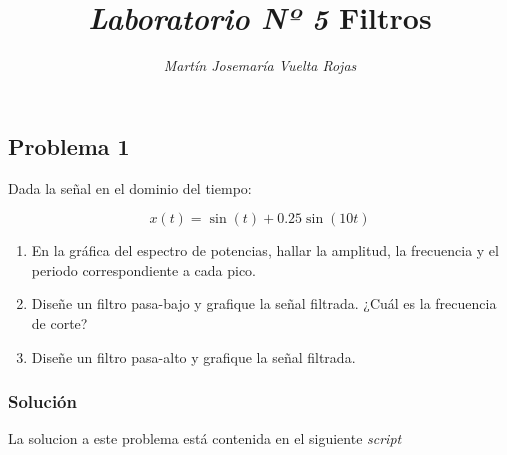 \documentclass[a4paper,12pt,final]{article}
\begin{document}
  \title{\textit{\Large Laboratorio Nº 5}\linebreak{}\linebreak{}
  \textbf{\Huge Filtros}}
  \author{\emph{Martín Josemaría Vuelta Rojas}}
  \maketitle

  \subsection*{Problema 1}
    \noindent Dada la señal en el dominio del tiempo:

      $$x\left(t\right) = \sin\left(t\right) + 0.25\sin\left(10t\right)$$

      \begin{enumerate}[label=\alph*)]
        \item En la gráfica del espectro de potencias, hallar la amplitud,
              la frecuencia y el periodo correspondiente a cada pico.
        \item Diseñe un filtro pasa-bajo y grafique la señal filtrada.
              ¿Cuál es la frecuencia de corte?
        \item Diseñe un filtro pasa-alto y grafique la señal filtrada.
    \end{enumerate}

    \subsubsection*{Solución}

    \noindent La solucion a este problema está contenida en el siguiente \emph{script}
    \begin{listing}[H]
      \label{script:1.1a}
      \inputminted[lastline=21]{matlab}{./laboratorio_5/problema01.m}
    \end{listing}
    \vspace{-1em}
    \vfill

    \newpage
    \vspace{-1em}
    \begin{listing}[H]
      \label{scr:1.1b}
      \inputminted[firstline=23,lastline=80]{matlab}{./laboratorio_5/problema01.m}
    \end{listing}
    \vspace{-1em}
    \vfill
\end{document}
